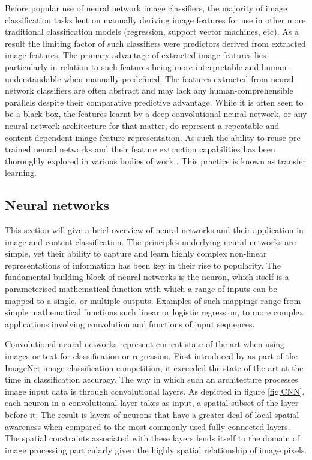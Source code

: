 \documentclass{article}
\begin{document}
Before popular use of neural network image classifiers, the majority of image classification tasks lent on manually deriving image features for use in other more traditional classification models (regression, support vector machines, etc).
As a result the limiting factor of such classifiers were predictors derived from extracted image features.
The primary advantage of extracted image features lies particularly in relation to such features being more interpretable and human-understandable when manually predefined.
The features extracted from neural network classifiers are often abstract and may lack any human-comprehensible parallels despite their comparative predictive advantage.
While it is often seen to be a black-box, the features learnt by a deep convolutional neural network, or any neural network architecture for that matter, do represent a repeatable and content-dependent image feature representation.
As such the ability to reuse pre-trained neural networks and their feature extraction capabilities has been thoroughly explored in various bodies of work \citep{kim2018building,pan2009survey,you2015robust}.
This practice is known as transfer learning.

\subsection{Neural networks} \label{sec:neural-network-overview}

This section will give a brief overview of neural networks and their application in image and content classification.
The principles underlying neural networks are simple, yet their ability to capture and learn highly complex non-linear representations of information has been key in their rise to popularity.
The fundamental building block of neural networks is the neuron, which itself is a parameterised mathematical function with which a range of inputs can be mapped to a single, or multiple outputs.
Examples of such mappings range from simple mathematical functions such linear or logistic regression, to more complex applications involving convolution and functions of input sequences.

Convolutional neural networks represent current state-of-the-art when using images or text for classification or regression.
First introduced by \citet{krizhevsky2012imagenet} as part of the ImageNet image classification competition, it exceeded the state-of-the-art at the time in classification accuracy.
The way in which such an architecture processes image input data is through convolutional layers.
As depicted in figure \ref{fig:CNN}, each neuron in a convolutional layer takes as input, a spatial subset of the layer before it.
The result is layers of neurons that have a greater deal of local spatial awareness when compared to the most commonly used fully connected layers.
The spatial constraints associated with these layers lends itself to the domain of image processing particularly given the highly spatial relationship of image pixels.
\end{document}
